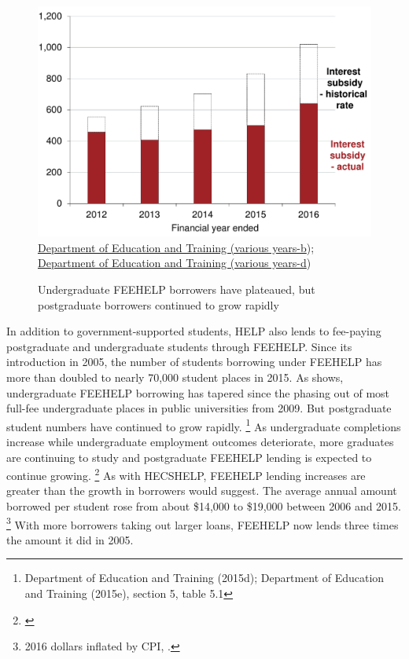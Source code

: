 \documentclass[embargoed]{grattan}
\begin{document}
\begin{figure}
\caption[Undergraduate FEE-HELP borrowers have plateaued, but postgraduate borrowers continued to grow rapidly]{Undergraduate \gls{FEEHELP} borrowers have plateaued, but postgraduate borrowers continued to grow rapidly}\label{fig:fig5-undergrad-HELP-borrowers-have-plateaued-but-postgrad-borrowers-continued-to-grow-rapidly}

\includegraphics[page=5]{atlas/Chartpack.pdf}
%
{\protect\hyperlink{_ENREF_36}{Department of Education and Training (various years-b}); \protect\hyperlink{_ENREF_38}{Department of Education and Training (various years-d})}
\end{figure}

In addition to government-supported students, \gls{HELP} also lends to fee-paying postgraduate and undergraduate students through \gls{FEEHELP}.
Since its introduction in 2005, the number of students borrowing under \gls{FEEHELP} has more than doubled to nearly 70,000 student places in 2015.
As  shows, undergraduate \gls{FEEHELP} borrowing has tapered since the phasing out of most full-fee undergraduate places in public universities from 2009.
But postgraduate student numbers have continued to grow rapidly.%
\footnote{Department of Education and Training (2015d); Department of Education and Training (2015e), section 5, table 5.1} As undergraduate completions increase while undergraduate employment outcomes deteriorate, more graduates are continuing to study and postgraduate \gls{FEEHELP} lending is expected to continue growing.%
\footnote{\textcites{Norton2016MappingAustralianhigher}{Education2016uCubeHighereducation}}
As with \gls{HECSHELP}, \gls{FEEHELP} lending increases are greater than the growth in borrowers would suggest.
The average annual amount borrowed per student rose from about \$14,000 to \$19,000 between 2006 and 2015.%
\footnote{2016 dollars inflated by \gls{CPI}, \textcite{ABS2016ConsumerPriceIndex}.} With more borrowers taking out larger loans, \gls{FEEHELP} now lends three times the amount it did in 2005.
\end{document}
